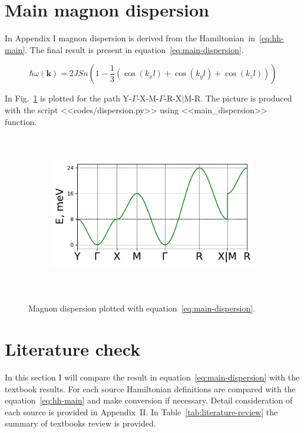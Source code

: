\documentclass[a4paper,12pt]{article}
\begin{document}
    \section{Main magnon dispersion}

        In Appendix I magnon dispersion is derived from the Hamiltonian~in~\eqref{eq:hh-main}.
        The final result is present in equation~\ref{eq:main-dispersion}. 

        \begin{equation}
            \boxed{
            \hbar\omega(\mathbf{k}) = 2JSn\left(1 - 
            \dfrac{1}{3}\left(\cos(k_x l) + \cos(k_y l) + \cos(k_z l)\right)\right)}
            \label{eq:main-dispersion}
        \end{equation}

        In Fig.~\ref{fig:main-dispersion} is plotted for the path Y-$\Gamma$-X-M-$\Gamma$-R-X$\vert$M-R. 
        The picture is produced with the script <<codes/dispersion.py>> using 
        <<main\_dispersion>> function.


        \begin{figure}[H]
            \centering
            \begin{subfigure}[b]{0.8\textwidth}
                \centering
                \includegraphics[height=7cm]{main_dispersion.pdf}
            \end{subfigure}
            \hfill
            \caption{Magnon dispersion plotted with equation~\eqref{eq:main-dispersion}.}
            \label{fig:main-dispersion}
        \end{figure}

        \section{Literature check}
        In this section I will compare the result in equation~\eqref{eq:main-dispersion} with the textbook results. 
        For each source Hamiltonian definitions are compared with the equation~\eqref{eq:hh-main} and make conversion if necessary. 
        Detail consideration of each source is provided in Appendix~II. In Table~\ref{tab:literature-review} the summary of textbooks review is provided.
\end{document}
